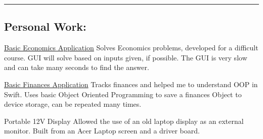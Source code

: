 \documentclass[11pt,letterpaper]{article}
\newenvironment{indentsection}[1]%
{\begin{list}{}%
	{\setlength{\leftmargin}{#1}}%
	\item[]%
}
{\end{list}}
\begin{document}
\hrule
\vspace{-0.4em}
\subsection*{\Large{Personal Work:}}

\begin{indentsection}{\parindent}
\begin{description*}
	\item[\href{https://github.com/jeremyggiese/jgieseRepo/tree/master/Economics}{Basic Economics Application}]
	Solves Economics problems, developed for a difficult course. GUI will solve based on inputs given, if possible. The GUI is very slow and can take many seconds to find the answer.
	\item[\href{https://github.com/jeremyggiese/jgieseRepo/tree/master/iOS/Finances}{Basic Finances Application}]
	Tracks finances and helped me to understand OOP in Swift. Uses basic Object Oriented Programming to save a finances Object to device storage, can be repeated many times.
	\item[Portable 12V Display]
	Allowed the use of an old laptop display as an external monitor. Built from an Acer Laptop screen and a driver board.
		
\end{description*}
\end{indentsection}

%
\end{document}
